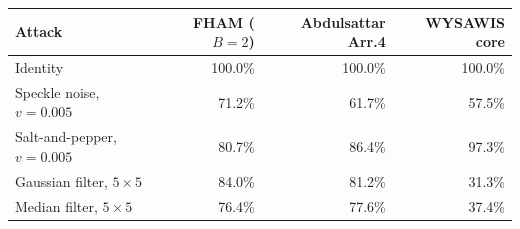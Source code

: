 \begin{tabular}{lrrr}
\toprule
\textbf{Attack} & \textbf{FHAM ($B=2$)} & \textbf{Abdulsattar Arr.4} & \textbf{WYSAWIS core} \\
\midrule
Identity & 100.0\% & 100.0\% & 100.0\% \\
Speckle noise, $v=0.005$ & 71.2\% & 61.7\% & 57.5\% \\
Salt-and-pepper, $v=0.005$ & 80.7\% & 86.4\% & 97.3\% \\
Gaussian filter, $5\times5$ & 84.0\% & 81.2\% & 31.3\% \\
Median filter, $5\times5$ & 76.4\% & 77.6\% & 37.4\% \\
\bottomrule
\end{tabular}
